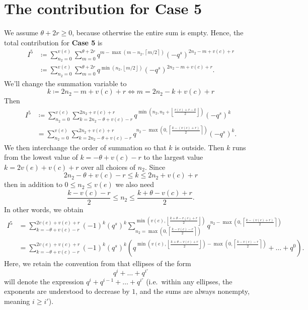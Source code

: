 \section{The contribution for Case 5}
We assume $\theta + 2r \ge 0$, because otherwise the entire sum is empty.
Hence, the total contribution for \textbf{Case 5} is
\begin{align*}
  I^{\text{5}}
  &\coloneqq \sum_{n_2 = 0}^{v(e)} \sum_{m = 0}^{\theta + 2r}
  q^{m - \max\left( m-n_2, \left\lceil m/2 \right\rceil \right)}
  (-q^s)^{2n_2 - m + v(c) + r} \\
  &\coloneqq \sum_{n_2 = 0}^{v(e)} \sum_{m = 0}^{\theta + 2r}
  q^{\min\left( n_2, \left\lfloor m/2 \right\rfloor \right)}
  (-q^s)^{2n_2 - m + v(c) + r}.
\end{align*}
We'll change the summation variable to
\[ k \coloneqq 2n_2 - m + v(c) + r
\iff m = 2n_2 - k + v(c) + r \]
Then
\begin{align*}
  I^{\text{5}}
  &\coloneqq \sum_{n_2 = 0}^{v(e)}
  \sum_{k = 2n_2 - \theta + v(c) - r}^{2n_2 + v(c) + r}
  q^{\min\left( n_2, n_2 + \left\lfloor \frac{v(c)+r-k}{2} \right\rfloor \right)} (-q^s)^{k} \\
  &= \sum_{n_2 = 0}^{v(e)}
  \sum_{k = 2n_2 - \theta + v(c) - r}^{2n_2 + v(c) + r}
  q^{n_2 - \max\left( 0, \left\lceil \frac{k-(v(c)+r)}{2} \right\rceil \right)} (-q^s)^{k}.
\end{align*}
We then interchange the order of summation so that $k$ is outside.
Then $k$ runs from the lowest value of $k = - \theta + v(c) - r$
to the largest value $k = 2v(e) + v(c) + r$ over all choices of $n_2$.
Since
\[ 2n_2 - \theta + v(c) - r \le k \le 2 n_2 + v(c) + r \]
then in addition to $0 \le n_2 \le v(e)$ we also need
\[ \frac{k-v(c)-r}{2} \le n_2 \le \frac{k + \theta - v(c) + r}{2}. \]
In other words, we obtain
\begin{align*}
  I^{\text{5}}
  &= \sum_{k = - \theta + v(c) - r}^{2v(e) + v(c) + r}
  (-1)^k (q^s)^k \sum_{n_2 = \max\left(0, \left\lceil \frac{k - v(c) - r}{2} \right\rceil \right)}
  ^{\min\left(v(e), \left\lfloor \frac{k + \theta - v(c) + r}{2} \right\rfloor\right)}
  q^{n_2 - \max\left( 0, \left\lceil \frac{k-(v(c)+r)}{2} \right\rceil \right)} \\
  &= \sum_{k = - \theta + v(c) - r}^{2v(e) + v(c) + r}
  (-1)^k (q^s)^k
  \left( q^{\min\left( v(e), \left\lfloor \frac{k+\theta-v(c)+r}{2} \right\rfloor \right) - \max\left( 0, \left\lceil \frac{k-v(c)-r}{2} \right\rceil \right)} + \dots + q^0 \right).
\end{align*}
Here, we retain the convention from  that ellipses of the form
\[ q^i + \dots + q^{i'} \]
will denote the expression $q^i + q^{i-1} + \dots + q^{i'}$
(i.e.\ within any ellipses, the exponents are understood to decrease by $1$,
and the sums are always nonempty, meaning $i \ge i'$).

